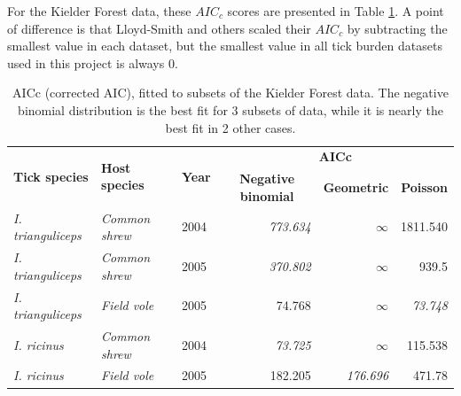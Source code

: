 \documentclass{article}
\begin{document}
For the Kielder Forest data, these $ AIC_c $ scores are presented in Table \ref{tab:kielderAIC}. A point of difference is that Lloyd-Smith and others scaled their $AIC_c $ by subtracting the smallest value in each dataset, but the smallest value in all tick burden datasets used in this project is always $ 0 $.

\begin{table}[ht]
	\begin{mdframed}[backgroundcolor=grey250,rightline=false,leftline=false,topline=false]
	\centering
	\begin{tabular}{|l|l|l|rrr|}
		\hline
		\multirow{2}{*}{\textbf{Tick species}} & \multirow{2}{*}{\textbf{Host species}} & \multirow{2}{*}{\textbf{Year}} & \multicolumn{3}{c|}{\textbf{AICc}}                                                                                                \\ \cline{4-6} 
		&                                        &                                & \multicolumn{1}{c|}{\textbf{Negative binomial}} & \multicolumn{1}{c|}{\textbf{Geometric}} & \multicolumn{1}{c|}{\textbf{Poisson}} \\ \hline
		\textit{I. trianguliceps}              & \textit{Common shrew}                  & 2004                           & \multicolumn{1}{r|}{\textit{773.634}}           & \multicolumn{1}{r|}{$\infty$}           & 1811.540                              \\ \hline
		\textit{I. trianguliceps}              & \textit{Common shrew}                  & 2005                           & \multicolumn{1}{r|}{\textit{370.802}}           & \multicolumn{1}{r|}{$\infty$}           & 939.5                                 \\ \hline
		\textit{I. trianguliceps}              & \textit{Field vole}                    & 2005                           & \multicolumn{1}{r|}{74.768}                     & \multicolumn{1}{r|}{$\infty$}           & \textit{73.748}                       \\ \hline
		\textit{I. ricinus}                    & \textit{Common shrew}                  & 2004                           & \multicolumn{1}{r|}{\textit{73.725}}            & \multicolumn{1}{r|}{$\infty$}           & 115.538                               \\ \hline
		\textit{I. ricinus}                    & \textit{Field vole}                    & 2005                           & \multicolumn{1}{r|}{182.205}                    & \multicolumn{1}{r|}{\textit{176.696}}   & 471.78                                \\ \hline
	\end{tabular}
	\caption{AICc (corrected AIC), fitted to subsets of the Kielder Forest data. The negative binomial distribution is the best fit for 3 subsets of data, while it is nearly the best fit in 2 other cases.}
	\label{tab:kielderAIC}
	\end{mdframed}
\end{table}
\end{document}
